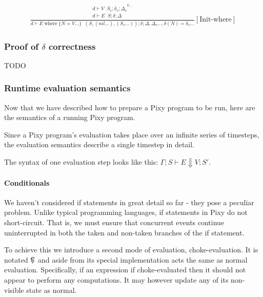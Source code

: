 \documentclass{scrartcl}
\DeclareMathOperator{\where}{where}
\DeclareMathOperator{\ceval}{\overset{C}{\smash{\Downarrow}}}
\DeclareMathOperator{\initrel}{\overset{init}{\Rightarrow}}
\begin{document}
    \begin{align*}
    \frac{
        \begin{matrix}
        \overline{d \vdash V \initrel S_v; \delta_v; \Delta_v}^{V...} \\
        d \vdash E \initrel S; \delta; \Delta
        \end{matrix}
    }{
        d \vdash E \where \{ N=V... \} \initrel (S, (nil...), (S_v...)); \delta; \Delta, \Delta_v..., \delta(N)=\delta_v...
    }[\text{Init-where}]
    \end{align*}
    
    \subsubsection{Proof of $\delta$ correctness}
    
    TODO
    
    \subsubsection{Runtime evaluation semantics}
    
    Now that we have described how to prepare a Pixy program to be run, here are the semantics of a running Pixy program.
    
    Since a Pixy program's evaluation takes place over an infinite series of timesteps, the evaluation semantics describe a single timestep in detail.
    
    The syntax of one evaluation step looks like this: $\Gamma; S \vdash E \Downarrow V; S'$.
    
    \paragraph{Conditionals}
    
    We haven't considered if statements in great detail so far - they pose a peculiar problem. Unlike typical programming languages, if statements in Pixy do not short-circuit. That is, we must ensure that concurrent events continue uninterrupted in both the taken and non-taken branches of the if statement.
    
    To achieve this we introduce a second mode of evaluation, choke-evaluation. It is notated $\ceval$ and aside from its special implementation acts the same as normal evaluation. Specifically, if an expression if choke-evaluated then it should not appear to perform any computations. It may however update any of its non-visible state as normal.
    
\end{document}
